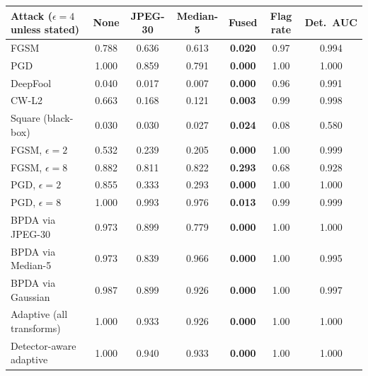 \begin{tabular}{lcccccc}
\toprule
Attack ($\epsilon{=}4$ unless stated) & None & JPEG-30 & Median-5 & Fused & Flag rate & Det.\ AUC \\
\midrule
FGSM & 0.788 & 0.636 & 0.613 & \textbf{0.020} & 0.97 & 0.994 \\
PGD & 1.000 & 0.859 & 0.791 & \textbf{0.000} & 1.00 & 1.000 \\
\midrule
DeepFool & 0.040 & 0.017 & 0.007 & \textbf{0.000} & 0.96 & 0.991 \\
CW-L2 & 0.663 & 0.168 & 0.121 & \textbf{0.003} & 0.99 & 0.998 \\
Square (black-box) & 0.030 & 0.030 & 0.027 & \textbf{0.024} & 0.08 & 0.580 \\
\midrule
FGSM, $\epsilon{=}2$ & 0.532 & 0.239 & 0.205 & \textbf{0.000} & 1.00 & 0.999 \\
FGSM, $\epsilon{=}8$ & 0.882 & 0.811 & 0.822 & \textbf{0.293} & 0.68 & 0.928 \\
PGD, $\epsilon{=}2$ & 0.855 & 0.333 & 0.293 & \textbf{0.000} & 1.00 & 1.000 \\
PGD, $\epsilon{=}8$ & 1.000 & 0.993 & 0.976 & \textbf{0.013} & 0.99 & 0.999 \\
\midrule
BPDA via JPEG-30 & 0.973 & 0.899 & 0.779 & \textbf{0.000} & 1.00 & 1.000 \\
BPDA via Median-5 & 0.973 & 0.839 & 0.966 & \textbf{0.000} & 1.00 & 0.995 \\
BPDA via Gaussian & 0.987 & 0.899 & 0.926 & \textbf{0.000} & 1.00 & 0.997 \\
Adaptive (all transforms) & 1.000 & 0.933 & 0.926 & \textbf{0.000} & 1.00 & 1.000 \\
Detector-aware adaptive & 1.000 & 0.940 & 0.933 & \textbf{0.000} & 1.00 & 1.000 \\
\bottomrule
\end{tabular}
